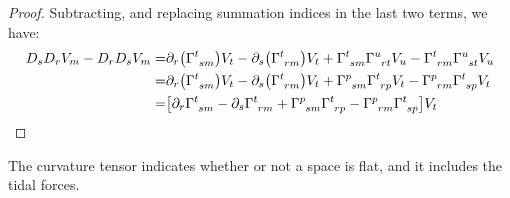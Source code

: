 \documentclass[]{article}
\begin{document}
\begin{proof}
	Subtracting, and replacing summation indices in the last two terms, we have:
	\begin{align*}
		D_s D_r V_m - D_r D_s V_m =& \partial_r \big( \Gamma \indices{^t_{sm}} \big)V_t - \partial_s \big( \Gamma \indices{^t_{rm}} \big)V_t + \Gamma\indices{^t_{sm}}\Gamma \indices{^u_{rt}} V_u - \Gamma\indices{^t_{rm}}\Gamma \indices{^u_{st}} V_u\\
		=& \partial_r \big( \Gamma \indices{^t_{sm}} \big)V_t - \partial_s \big( \Gamma \indices{^t_{rm}} \big)V_t + \Gamma\indices{^p_{sm}}\Gamma \indices{^t_{rp}} V_t - \Gamma\indices{^p_{rm}}\Gamma \indices{^t_{sp}} V_t\\
		=& \big[\partial_r  \Gamma \indices{^t_{sm}}  - \partial_s \Gamma \indices{^t_{rm}} + \Gamma\indices{^p_{sm}}\Gamma \indices{^t_{rp}}  - \Gamma\indices{^p_{rm}}\Gamma \indices{^t_{sp}} \big] V_t
	\end{align*}
\end{proof}

The curvature tensor indicates whether or not a space is flat, and it includes the tidal forces.
\end{document}
